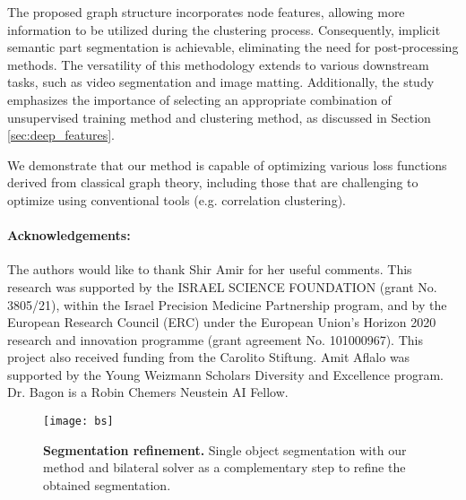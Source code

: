\documentclass[10pt,twocolumn,letterpaper]{article}
\begin{document}
The proposed graph structure incorporates node features, allowing more information to be utilized during the clustering process. Consequently, implicit semantic part segmentation is achievable, eliminating the need for post-processing methods. The versatility of this methodology extends to various downstream tasks, such as video segmentation and image matting. Additionally, the study emphasizes the importance of selecting an appropriate combination of unsupervised training method and clustering method, as discussed in Section \cref{sec:deep_features}.

We demonstrate that our method is capable of optimizing various loss functions derived from classical graph theory, including those that are challenging to optimize using conventional tools (e.g. correlation clustering).

\ificcvfinal
\paragraph{Acknowledgements:} 
The authors would like to thank Shir Amir for her useful comments.
This research was supported by the ISRAEL SCIENCE FOUNDATION
(grant No. 3805/21), within the Israel Precision Medicine Partnership program, and by the
European Research Council (ERC) under the European Union’s Horizon 2020 research and innovation programme (grant agreement No. 101000967).
This project also received funding from the Carolito Stiftung.
Amit Aflalo was supported by the Young Weizmann Scholars Diversity and Excellence program.
Dr. Bagon is a Robin Chemers Neustein AI Fellow.
\fi

{\small


}

\clearpage
\setcounter{section}{0}


\begin{figure}[t]
\texttt{[image: bs]}
\caption{
\textbf{Segmentation refinement.} Single object segmentation with our method and bilateral solver\cite{barron2016fast} as a complementary step to refine the obtained segmentation.
}
\label{fig:bs}
 \end{figure}
\end{document}
